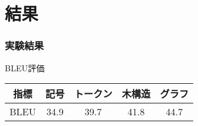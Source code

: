 \documentclass[dvipdfmx]{beamer}
\begin{document}
\section{結果}
\begin{frame}
\frametitle{実験結果}
\begin{block}{BLEU評価}
  \label{table:evaluation}
  \centering
  \begin{tabular}{ccccc}
    \hline
    指標  & 記号 & トークン & 木構造 & グラフ \\
    \hline \hline
    BLEU  & 34.9   & 39.7 & 41.8  & 44.7\\
    \hline
  \end{tabular}
\label{sec:result}
\end{block}
\end{frame}
\end{document}

